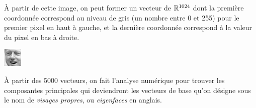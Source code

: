 \begin{adjmulticols}{1}{0in}{-2in}
\begin{center}
\begin{minipage}{0.9\textwidth}
À partir de cette image, on peut former un vecteur de $\mathbb{R}^{1024}$
dont la première coordonnée correspond au niveau de gris (un nombre entre 0
et 255) pour le premier pixel en haut à gauche, et la dernière coordonnée
correspond à la valeur du pixel en bas à droite.
\end{minipage}
\hfill
\begin{minipage}{0.45\textwidth}
\includegraphics[width=\linewidth]{./images/clint1}
\end{minipage}
\end{center}

\begin{center}
\begin{minipage}{0.9\textwidth}
À partir des 5000 vecteurs, on fait l'analyse numérique pour trouver
les composantes principales qui deviendront les vecteurs de base
qu'on désigne sous le nom de \textit{visages propres}, ou 
\textit{eigenfaces} en anglais.


\end{minipage}
\end{center}
\end{adjmulticols}
